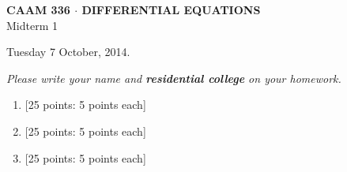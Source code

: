 \documentclass[10pt]{article}
\begin{document}
\vspace*{-5em}
\begin{center}
\large \textsf{\textbf{CAAM 336 $\cdot$ DIFFERENTIAL EQUATIONS}\\[0.5em]
Midterm 1 }
\end{center}

Tuesday 7 October, 2014.
\begin{center}
\emph{Please write your name and \textbf{residential college} on your homework.}
\end{center}

\begin{enumerate}
\item {[25 points: 5 points each]}\\  
\newpage
\item {[25 points: 5 points each]}\\  
\newpage
\item {[25 points: 5 points each]}\\  


\end{enumerate}
\end{document}

